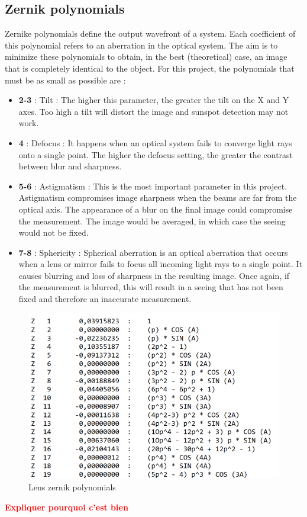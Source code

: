 \subsection{Zernik polynomials}
Zernike polynomials define the output wavefront of a system. Each coefficient of this polynomial refers to an
aberration in the optical system. The aim is to minimize these polynomials to obtain, in the best (theoretical)
case, an image that is completely identical to the object. For this project, the polynomials that must be as small as possible are :
\begin{itemize}
    \item \textbf{2-3} : Tilt : The higher this parameter, the greater the tilt on the X and Y axes. Too high a tilt will distort
          the image and sunspot detection may not work.
    \item \textbf{4}   : Defocus : It happens when an optical system fails to converge light rays onto a single point. The higher the
          defocus setting, the greater the contrast between blur and sharpness.
    \item \textbf{5-6} : Astigmatism : This is the most important parameter in this project. Astigmatism compromises image
          sharpness when the beams are far from the optical axis. The appearance of a blur on the final image could compromise the
          measurement. The image would be averaged, in which case the seeing would not be fixed.
    \item \textbf{7-8} : Sphericity : Spherical aberration is an optical aberration that occurs when a lens or mirror fails to focus all
          incoming light rays to a single point. It causes blurring and loss of sharpness in the resulting image. Once again, if the measurement
          is blurred, this will result in a seeing that has not been fixed and therefore an inaccurate measurement.
\end{itemize}
\begin{figure}[H]
    \centering
    \includegraphics[scale=0.9]{assets/figures/Optical Design/Zemax_Zernik.png}
    \caption{Lens zernik polynomials}
    \label{fig:Opti_ZemaxZernik}
\end{figure}
\textbf{\textcolor{red}{Expliquer pourquoi c'est bien}}
